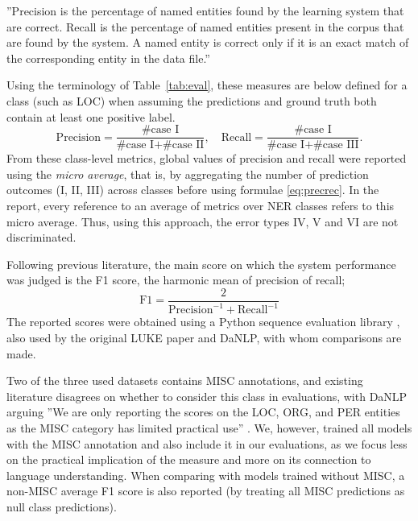 \documentclass[main.tex]{subfiles}
\begin{document}
''Precision is the percentage of named entities found by the learning system that are correct.
Recall is the percentage of named entities present in the corpus that are found by the system.
A named entity is correct only if it is an exact match of the corresponding entity in the data file.''
\cite[Sec 2.4]{tjang2003conll}

Using the terminology of Table~\ref{tab:eval}, these measures are below defined for a class (such as LOC) when assuming the predictions and ground truth both contain at least one positive label.
\begin{equation}
    \label{eq:precrec}
    \text{Precision} = \frac{\text{\# case I}}{\text{\# case I} + \text{\# case II}},\quad \text{Recall} = \frac{\text{\# case I}}{\text{\# case I} + \text{\# case III}}.
\end{equation}
From these class-level metrics, global values of precision and recall were reported using the \emph{micro average}, that is, by aggregating the number of prediction outcomes (I, II, III) across classes before using formulae \eqref{eq:precrec}.
In the report, every reference to an average of metrics over NER classes refers to this micro average.
Thus, using this approach, the error types IV, V and VI are not discriminated\footnotemark.

Following previous literature, the main score on which the system performance was judged is the F1 score, the harmonic mean of precision of recall;
\begin{equation}
    \label{eq:f1}
    \text{F1} = \dfrac{2}{\text{Precision}^{-1} + \text{Recall}^{-1}}
\end{equation}
The reported scores were obtained using a Python sequence evaluation library \cite{seqeval}, also used by the original LUKE paper and DaNLP, with whom comparisons are made.

Two of the three used datasets contains MISC annotations, and existing literature disagrees on whether to consider this class in evaluations, with DaNLP arguing
''We are only reporting the scores on the LOC, ORG, and PER entities as the MISC category has limited practical use'' \cite[Sec. ''Benchmarks'' in NER page]{danlp2021}.
We, however, trained all models with the MISC annotation and also include it in our evaluations, as we focus less on the practical implication of the measure and more on its connection to language understanding.
When comparing with models trained without MISC, a non-MISC average F1 score is also reported (by treating all MISC predictions as null class predictions).
\end{document}
